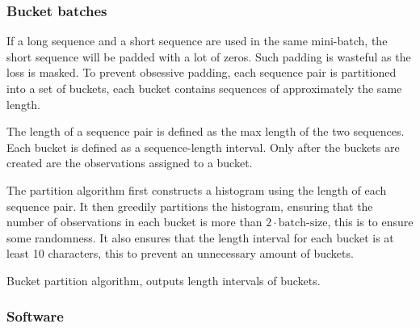 \subsubsection{Bucket batches}

If a long sequence and a short sequence are used in the same mini-batch, the short sequence will be padded with a lot of zeros. Such padding is wasteful as the loss is masked. To prevent obsessive padding, each sequence pair is partitioned into a set of buckets, each bucket contains sequences of approximately the same length.

The length of a sequence pair is defined as the max length of the two sequences. Each bucket is defined as a sequence-length interval. Only after the buckets are created are the observations assigned to a bucket.

The partition algorithm first constructs a histogram using the length of each sequence pair. It then greedily partitions the histogram, ensuring that the number of observations in each bucket is more than $2 \cdot \text{batch-size}$, this is to ensure some randomness. It also ensures that the length interval for each bucket is at least 10 characters, this to prevent an unnecessary amount of buckets.

\begin{algorithm}[H]
  \caption{Bucket partition algorithm, outputs length intervals of buckets.}
  \begin{algorithmic}[1]

         
         
        \Else
           \State {} 
            
        \EndIf
      \EndFor
      \State {}
    \EndFunction
  \end{algorithmic}
\end{algorithm}

\subsubsection{Software}

